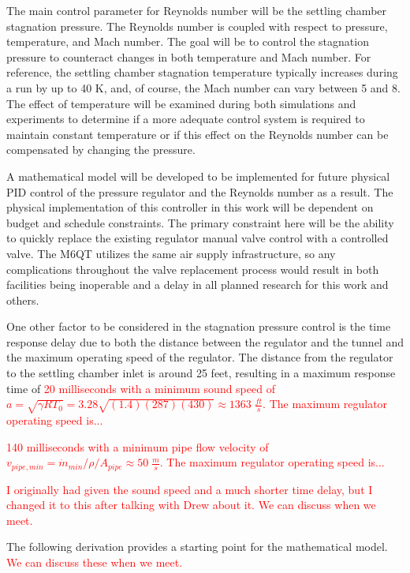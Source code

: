 The main control parameter for Reynolds number will be the settling chamber stagnation pressure. The Reynolds number is coupled with respect to pressure, temperature, and Mach number. The goal will be to control the stagnation pressure to counteract changes in both temperature and Mach number. For reference, the settling chamber stagnation temperature typically increases during a run by up to 40 K, and, of course, the Mach number can vary between 5 and 8. The effect of temperature will be examined during both simulations and experiments to determine if a more adequate control system is required to maintain constant temperature or if this effect on the Reynolds number can be compensated by changing the pressure.

A mathematical model will be developed to be implemented for future physical PID control of the pressure regulator and the Reynolds number as a result. The physical implementation of this controller in this work will be dependent on budget and schedule constraints. The primary constraint here will be the ability to quickly replace the existing regulator manual valve control with a controlled valve. The M6QT utilizes the same air supply infrastructure, so any complications throughout the valve replacement process would result in both facilities being inoperable and a delay in all planned research for this work and others.

One other factor to be considered in the stagnation pressure control is the time response delay due to both the distance between the regulator and the tunnel and the maximum operating speed of the regulator. The distance from the regulator to the settling chamber inlet is around 25 feet, resulting in a maximum response time of \textcolor{red}{20 milliseconds with a minimum sound speed of $a = \sqrt{\gamma R T_0} = 3.28\sqrt{(1.4)(287)(430)} \approx 1363 \; \frac{ft}{s}$. The maximum regulator operating speed is...}

\textcolor{red}{140 milliseconds with a minimum pipe flow velocity of $v_{pipe,min} = \dot{m}_{min}/\rho/A_{pipe} \approx 50 \; \frac{m}{s}$. The maximum regulator operating speed is...}

\textcolor{red}{I originally had given the sound speed and a much shorter time delay, but I changed it to this after talking with Drew about it. We can discuss when we meet.}

The following derivation provides a starting point for the mathematical model. \textcolor{red}{We can discuss these when we meet.}

